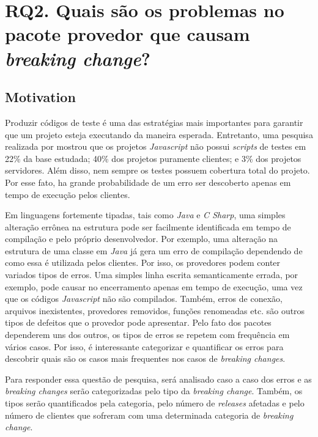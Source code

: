 \section{RQ2. Quais são os problemas no pacote provedor que causam \textit{breaking change}?}
\label{sec:rq2}

\subsection{Motivation}
\label{mot:rq2}

Produzir códigos de teste é uma das estratégias mais importantes para garantir que um projeto esteja executando da maneira esperada. Entretanto, uma pesquisa realizada por  mostrou que os projetos \textit{Javascript} não possui \textit{scripts} de testes em 22\% da base estudada; 40\% dos projetos puramente clientes; e 3\% dos projetos servidores. Além disso, nem sempre os testes possuem cobertura total do projeto. Por esse fato, ha grande probabilidade de um erro ser descoberto apenas em tempo de execução pelos clientes.

Em linguagens fortemente tipadas, tais como \textit{Java} e \textit{C Sharp}, uma simples alteração errônea na estrutura pode ser facilmente identificada em tempo de compilação e pelo próprio desenvolvedor. Por exemplo, uma alteração na estrutura de uma classe em \textit{Java} já gera um erro de compilação dependendo de como essa é utilizada pelos clientes. Por isso, os provedores podem conter variados tipos de erros. Uma simples linha escrita semanticamente errada, por exemplo, pode causar no encerramento apenas em tempo de execução, uma vez que os códigos \textit{Javascript} não são compilados. Também, erros de conexão, arquivos inexistentes, provedores removidos, funções renomeadas etc. são outros tipos de defeitos que o provedor pode apresentar. Pelo fato dos pacotes dependerem uns dos outros, os tipos de erros se repetem com frequência em vários casos. Por isso, é interessante categorizar e quantificar os erros para descobrir quais são os casos mais frequentes nos casos de \textit{breaking changes}.

Para responder essa questão de pesquisa, será analisado caso a caso dos erros e as \textit{breaking changes} serão categorizadas pelo tipo da \textit{breaking change}. Também, os tipos serão quantificados pela categoria, pelo número de \textit{releases} afetadas e pelo número de clientes que sofreram com uma determinada categoria de \textit{breaking change}.

